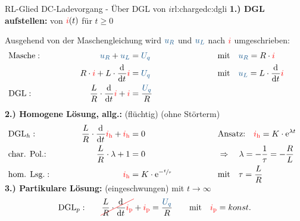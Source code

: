 \begin{frame}[t]
{\begin{bsp}{RL-Glied DC-Ladevorgang - Über DGL von $i$}{rl:chargedc:dgli}
    \textbf{1.) DGL aufstellen:} von ${\color{red}i}(t)$ für $t \geq 0$\vspace{5pt}

    Ausgehend von der Maschengleichung wird $\ecv{u_R}$ und $\ecv{u_L}$ nach ${\color{red}i}$ umgeschrieben:%
    \begingroup%
        \addtolength{\jot}{2pt}%
    \begin{align*}
        &\text{Masche}:&&&
            \ecv{u_R} + \ecv{u_L}  &= \ecv{U_q}&&&
            &\text{mit}\quad \ecv{u_R} = R \cdot \eci{i} \\
        &&&&
            R \cdot \eci{i} + L \cdot \dt \eci{i} &= \ecv{U_q} &&&
            &\text{mit}\quad \ecv{u_L} = L \cdot \dt \eci{i} \\
        &\text{DGL}:&&&
        \frac{L}{R} \cdot \dt \eci{i}  + \eci{i}  &= \frac{\ecv{U_q}}{R}
        \\[-15pt]&\hphantom{R1oooooooooo}&&&\hphantom{L3ooooooooooo}&\hphantom{R3ooooooooooooooo}&&&&\hphantom{R5oooooooooooooooooo}\nonumber%
    \end{align*}%
    \textbf{2.) Homogene Lösung, allg.:} (flüchtig) (ohne Störterm)%
    \begin{align*}%
        &\text{DGL}_{h}:&&&
            \frac{L}{R} \cdot \dt \eci{i_{\mathrm h}} + \eci{i_{\mathrm h}} &= 0 &&&
                &\text{Ansatz:}\quad
                \eci{i_{\mathrm h}} = K \cdot \mathrm{e}^{\lambda t}\\
        &\text{char. Pol.:}&&&
            \frac{L}{R} \cdot \lambda + 1 &= 0 &&&
                &\Rightarrow\quad \lambda = -\frac{1}{\tau} = -\frac{R}{L}\\
        &\text{hom. Lsg.}:&&&
            \eci{i_{\mathrm h}} &= K \cdot \mathrm{e}^{-\sfrac{t}{\tau}}&&&
                &\text{mit}\quad \tau = \frac{L}{R}
        \\[-15pt]&\hphantom{R1oooooooooo}&&&\hphantom{L3ooooooooooo}&\hphantom{R3ooooooooooooooo}&&&&\hphantom{R5oooooooooooooooooo}\nonumber%
    \end{align*}%
    \textbf{3.) Partikulare Lösung:} (eingeschwungen) mit $t \to \infty$%
    \begin{align*}%
        &\text{DGL}_{p}:&&&
            \redcancel{\frac{L}{R} \cdot \dt \eci{i_{\mathrm p}}} + \eci{i_{\mathrm p}} &= \frac{\ecv{U_q}}{R} &&&
                &\text{mit}\quad \eci{i_{\mathrm p}} = konst.  \\

\end{align*}
\end{bsp}}
\end{frame}
